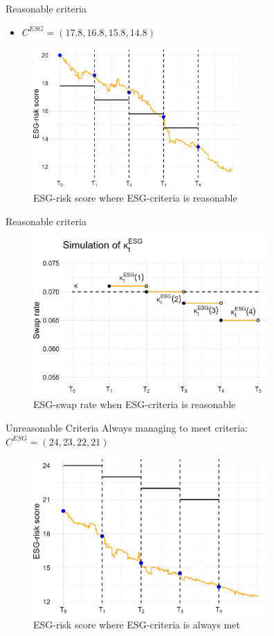 \documentclass[UKenglish]{beamer}
\begin{document}
\begin{frame}{Reasonable criteria}
\begin{itemize}
    \item $C^{ESG} = (17.8, 16.8, 15.8, 14.8)$
\end{itemize}
\begin{figure}[htp]
    \centering
    \includegraphics[width= 8cm]{ESG/ESG_plt_criteria1.png}
    \caption{ESG-risk score where ESG-criteria is reasonable}
    \label{fig: ESG_risk_criteria1}
\end{figure}    
\end{frame}


\begin{frame}{Reasonable criteria}
\begin{figure}[htp]
    \centering
    \includegraphics[width= 9cm]{ESG/kappa_t_ESG_1.png}
    \caption{ESG-swap rate when ESG-criteria is reasonable}
    \label{fig: ESG_swap_1}
\end{figure}
\end{frame}



\begin{frame}{Unreasonable Criteria}
Always managing to meet criteria: 
$C^{ESG} = (24,23,22,21)$
\begin{figure}[htp]
    \centering
    \includegraphics[width= 9cm]{ESG/ESG_plt_criteria2.png}
    \caption{ESG-risk score where ESG-criteria is always met}
    \label{fig: ESG_risk_criteria_2}
\end{figure}
\end{frame}
\end{document}
